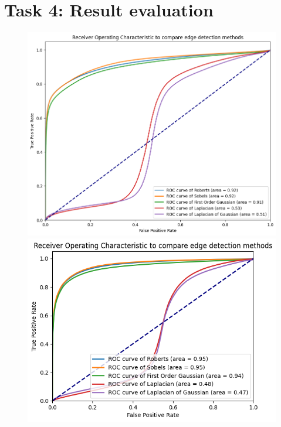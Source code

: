 \documentclass[11pt]{article}
\begin{document}
\section*{Task 4: Result evaluation}

\begin{figure}[h]
    \centering
    \begin{minipage}{0.3\textwidth}
        \centering
        \includegraphics[width=\linewidth]{../img/task4_ROC1.png}
    \end{minipage}\hfill
    \begin{minipage}{0.3\textwidth}
        \centering
        \includegraphics[width=\linewidth]{../img/task4_ROC2.png}

\end{minipage}
\end{figure}
\end{document}
